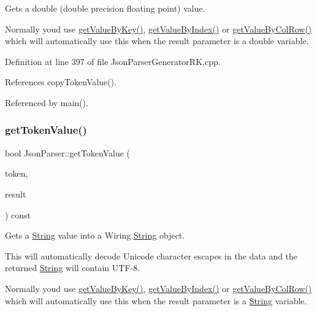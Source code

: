 Gets a double (double precision floating point) value. 

Normally you\textquotesingle{}d use \hyperlink{class_json_parser_a13abcdcb2341f65ac358bb4d81007d06}{get\+Value\+By\+Key()}, \hyperlink{class_json_parser_a53bd8a6ebb0d9b246b876653e792368f}{get\+Value\+By\+Index()} or \hyperlink{class_json_parser_af1f4a3a65b5cc9cd19b129c410aa78e0}{get\+Value\+By\+Col\+Row()} which will automatically use this when the result parameter is a double variable. 

Definition at line 397 of file Json\+Parser\+Generator\+R\+K.\+cpp.



References copy\+Token\+Value().



Referenced by main().

\mbox{\label{class_json_parser_a44cff567586e80ba63d39324e5929672}} 
\subsubsection{\texorpdfstring{get\+Token\+Value()}{getTokenValue()}\hspace{0.1cm}{\footnotesize\ttfamily [6/8]}}
{\footnotesize\ttfamily bool Json\+Parser\+::get\+Token\+Value (\begin{DoxyParamCaption}\item[{const \hyperlink{struct_json_parser_generator_r_k_1_1jsmntok__t}{Json\+Parser\+Generator\+R\+K\+::jsmntok\+\_\+t} $\ast$}]{token,  }\item[{\hyperlink{class_string}{String} \&}]{result }\end{DoxyParamCaption}) const}



Gets a \hyperlink{class_string}{String} value into a Wiring \hyperlink{class_string}{String} object. 

This will automatically decode Unicode character escapes in the data and the returned \hyperlink{class_string}{String} will contain U\+T\+F-\/8.

Normally you\textquotesingle{}d use \hyperlink{class_json_parser_a13abcdcb2341f65ac358bb4d81007d06}{get\+Value\+By\+Key()}, \hyperlink{class_json_parser_a53bd8a6ebb0d9b246b876653e792368f}{get\+Value\+By\+Index()} or \hyperlink{class_json_parser_af1f4a3a65b5cc9cd19b129c410aa78e0}{get\+Value\+By\+Col\+Row()} which will automatically use this when the result parameter is a \hyperlink{class_string}{String} variable. 

